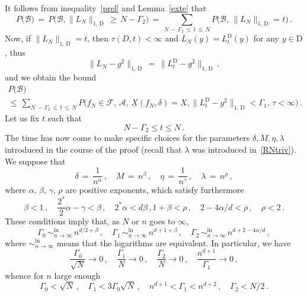 \documentclass[10pt]{amsart}
\theoremstyle{definition}\newtheorem{defi}[theo]{Definition}\newtheorem{rema}[theo]{Remark}\newtheorem{exam}[theo]{Example}\newtheorem{exem}[theo]{Example}\newtheorem{nota}[theo]{Notation}
\newcommand{\XX}{{\underline{X}}}
\newcommand*\lsim{\mathop{\sim}^{\ln}_{n\to\infty}}
\newcommand*\tD{\mathrm{D}}%
\newcommand{\cA}{\mathcal{A}}
\newcommand{\cB}{\mathcal{B}}
\newcommand{\cF}{\mathcal{F}}
\begin{document}
It follows from inequality~\eqref{prel} and Lemma~\ref{exte} that
\begin{equation*}
P\big(\cB)
\,=\, P\big(
\cB, \|L_N\|_{1,\,\tD}\,\geq\,N-\Gamma_2
\big)
\,=\,
\sum_{N\,-\,\Gamma_2\,\leq\,t\,\leq\,N} P\big(
\cB,\, \|L_N\|_{1,\,\tD}=t
\big)\,.
\end{equation*}
Now, if $\|L_N\|_{1,\,\tD}=t$, then $\tau(D,t)<\infty$ and $L_N(y)=L_t^{\tD}(y)$ for any $y\in \tD$, thus
\[
\|L_N-g^2\|_{1,\,\tD}\,=\,
\|L_t^{\tD}-g^2\|_{1,\,\tD}\,,
\]
and we obtain the bound
\begin{multline}\label{intera}
P\big(\cB\big)\\
\leq\,\sum_{N\,-\,\Gamma_2\,\leq\,t\,\leq\,N} P\big(f_N\in\cF,\,\cA,\,\XX(f_N,\delta)
=X, \|L_t^{\tD}-g^2\|_{1,\,\tD}<\Gamma_1,\,\tau<\infty
\big)\,.
\end{multline}
Let us fix $t$ such that
\begin{equation}\label{contg}
N-\Gamma_2\leq t\leq N\,.
\end{equation}
The time has now come to make specific choices for the parameters $\delta,M,\eta,\lambda$ introduced in the course of the proof (recall that $\lambda$ was introduced in~\eqref{RNtriv}). We suppose that
\begin{equation}
\delta\,=\,\frac{1}{n^\alpha}\,,\quad M\,=\,n^\beta\,,\quad
\eta\,=\,\frac{1}{n^\gamma}\,,\quad
\lambda\,=\,{n^\rho}\,,\label{expos}
\end{equation}
where $\alpha,\,\beta,\,\gamma,\,\rho$ are positive exponents, which satisfy furthermore
\begin{equation}\label{furco}
\beta<1\,,\quad \frac{2^*}{2}\alpha-\gamma<\beta\,,\quad 2^*\alpha<d\beta\,,
 1+\beta<\rho\,,\quad 2-4\alpha/d<\rho\,,\quad
\rho<2\,.
\end{equation}
These conditions imply that, as $N$ or $n$ goes to $\infty$,
\begin{equation}\label{dxr}
\Gamma_0\,\lsim\,n^{d/2+\beta}\,,\quad
\Gamma_1\,\lsim\,n^{d+1+\beta}\,,\quad
\Gamma_2\,\lsim\,n^{d+2-4\alpha/d}\,,
\end{equation}
where $\lsim$ means that the logarithms are equivalent. In particular, we have
\begin{equation}\label{der}
\frac{\Gamma_0}{\sqrt N}\to0\,,\quad
\frac{\Gamma_1}{N}\to0\,,\quad
\frac{\Gamma_2}{N}\to0\,,\quad
\frac{n^{d+1}}{\Gamma_1}\to0\,,
\end{equation}
whence for $n$ large enough
\begin{equation}\label{aer}
\Gamma_0<\sqrt{N}\,,\quad
\Gamma_1<3\Gamma_0\sqrt{N}\,,\quad n^{d+1}<\Gamma_1<n^{d+2}\,,\quad
\Gamma_2<N/2\,.
\end{equation}
\end{document}
